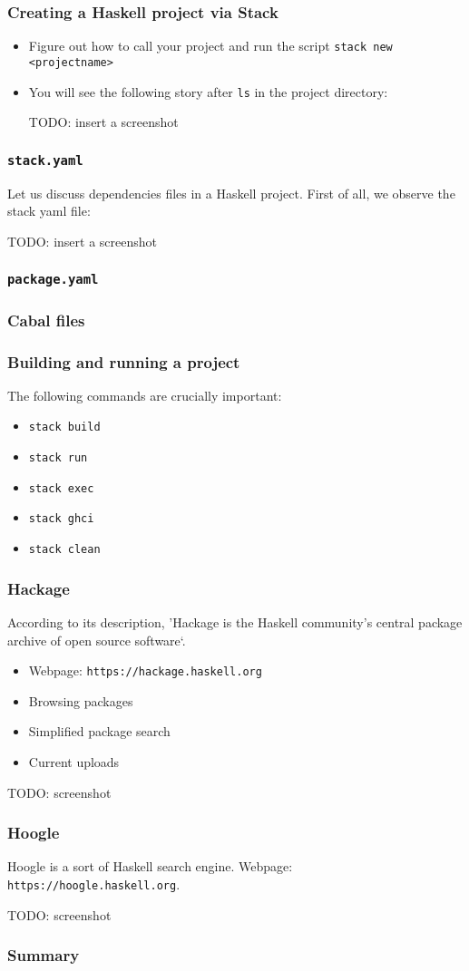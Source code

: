 \documentclass[10pt,pdf,utf8,russian,aspectratio=169]{beamer}
\begin{document}
\begin{frame}
  \frametitle{Creating a Haskell project via Stack}
  \begin{itemize}
    \item Figure out how to call your project and run the script \verb"stack new <projectname>"
    \item You will see the following story after \verb"ls" in the project directory:

    TODO: insert a screenshot
  \end{itemize}
\end{frame}

\begin{frame}
  \frametitle{\verb"stack.yaml"}

  Let us discuss dependencies files in a Haskell project. First of all, we observe the stack yaml file:

  TODO: insert a screenshot
\end{frame}

\begin{frame}
  \frametitle{\verb"package.yaml"}
\end{frame}

\begin{frame}
  \frametitle{Cabal files}
\end{frame}

\begin{frame}
  \frametitle{Building and running a project}

The following commands are crucially important:

  \begin{itemize}
    \item \verb"stack build"
    \item \verb"stack run"
    \item \verb"stack exec"
    \item \verb"stack ghci"
    \item \verb"stack clean"
  \end{itemize}
\end{frame}

\begin{frame}
  \frametitle{Hackage}

  According to its description, 'Hackage is the Haskell community's central package archive of open source software`.

  \begin{itemize}
    \item Webpage: \verb"https://hackage.haskell.org"
    \item Browsing packages
    \item Simplified package search
    \item Current uploads
  \end{itemize}

  TODO: screenshot
\end{frame}

\begin{frame}
  \frametitle{Hoogle}

  Hoogle is a sort of Haskell search engine. Webpage: \verb"https://hoogle.haskell.org".

  TODO: screenshot
\end{frame}

\begin{frame}
  \frametitle{Summary}
\end{frame}
\end{document}
